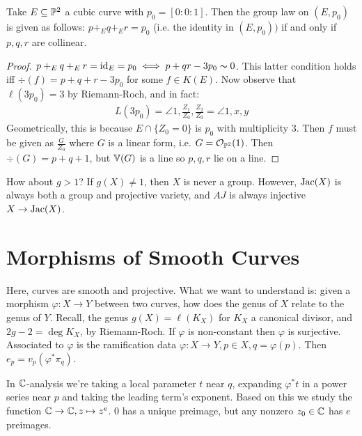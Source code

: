\documentclass[10pt,a4paper,rgb]{article}
\begin{document}
\begin{theorem}
Take $E \subseteq \P^2$ a cubic curve with $p_0 = [0:0:1]$. Then the group law on $(E,p_0)$ is given as follows: $p+_Eq+_Er= p_0$ (i.e. the identity in $(E,p_0))$ if and only if $p,q,r$ are collinear.
\end{theorem}
\begin{proof}
$p+_Eq+_Er = \id_E = p_0 \iff p+qr-3p_0 \thicksim 0$. This latter condition holds iff $\div(f) = p+q+r-3p_0$ for some $f \in K(E)$. Now observe that $\ell(3p_0) = 3$ by Riemann-Roch, and in fact:
\begin{align*}
L(3p_0) = \angle{1, \frac{Z_1}{Z_0}, \frac{Z_2}{Z_0}} = \angle{1,x,y}
\end{align*}
Geometrically, this is because $E \cap \{Z_0 = 0\}$ is $p_0$ with multiplicity $3$. Then $f$ must be given as $\frac{G}{Z_0}$ where $G$ is a linear form, i.e. $G = \mathcal{O}_{\P^2}(1)$. Then $\div(G) = p+q+1$, but $\V(G)$ is a line so $p,q,r$ lie on a line. 
\end{proof}
How about $g>1$? If $g(X) \neq 1$, then $X$ is never a group. However, $\Jac(X)$ is always both a group and projective variety, and $AJ$ is always injective $X \to \Jac(X)$.
\section{Morphisms of Smooth Curves}
Here, curves are smooth and projective. What we want to understand is: given a morphism $\varphi:X \to Y$ between two curves, how does the genus of $X$ relate to the genus of $Y$. Recall, the genus $g(X) = \ell(K_X)$ for $K_X$ a canonical divisor, and $2g-2 = \deg K_X$, by Riemann-Roch. If $\varphi$ is non-constant then $\varphi$ is surjective. Associated to $\varphi$ is the ramification data $\varphi:X \to Y, p \in X, q=\varphi(p)$. Then $e_p = v_p(\varphi^\ast \pi_q)$.

In $\C$-analysis we're taking a local parameter $t$ near $q$, expanding $\varphi^\ast t$ in a power series near $p$ and taking the leading term's exponent. Based on this we study the function $\C \to \C, z \mapsto z^e$. $0$ has a unique preimage, but any nonzero $z_0 \in \C$ has $e$ preimages.
\end{document}
